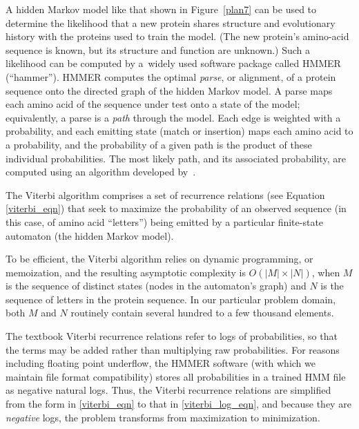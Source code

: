 \documentclass[preprint,nonatbib,blockstyle,nocopyrightspace,times]{sigplanconf}
\newcommand\figref[1]{Figure~\ref{#1}}
\begin{document}
A hidden Markov model like that shown in \figref{plan7} can be used to
determine the likelihood that a new protein shares structure and
evolutionary history with the proteins used to train the model.
(The new protein's amino-acid sequence is known, but its structure and
function are unknown.)
Such a likelihood can be computed by
a~widely used software package called HMMER (``hammer'').
HMMER computes the optimal \textit{parse}, or 
alignment, of a protein sequence onto the directed graph of the hidden Markov 
model.
A parse maps each amino acid of the sequence under test onto a state
of the model; equivalently, a parse is a \textit{path} through the model.
Each edge is weighted with a probability, and each emitting 
state (match or insertion) maps each amino acid to a probability,
and the 
probability of a given path is the product of these individual probabilities.
The most likely path, and its associated probability, are computed 
using an algorithm developed by~\citet{Viterbi:1967hq}.


The Viterbi algorithm comprises a set of recurrence 
relations (see Equation \ref{viterbi_eqn}) that seek to maximize the 
probability of an observed sequence (in this case, of amino acid ``letters'') 
being emitted by a particular finite-state automaton (the hidden Markov model).

To be efficient, the Viterbi 
algorithm relies on dynamic programming, or memoization, and the resulting 
asymptotic complexity is $O(|M|\times|N|)$, when $M$ is the sequence of 
distinct states (nodes in the automaton's graph) and $N$ is the sequence of 
letters in the protein sequence.
In our particular problem domain, both $M$ and 
$N$ routinely contain several hundred to a few thousand elements.

% 
% 
% 

The textbook Viterbi recurrence relations refer to logs of probabilities, so 
that the terms may be added rather than multiplying raw probabilities.
For 
reasons including floating point underflow, the HMMER software (with which we 
maintain file format compatibility) stores all probabilities in a trained HMM 
file as negative natural logs.
Thus, the Viterbi recurrence relations are 
simplified from the form in \ref{viterbi_eqn} to that in \ref{viterbi_log_eqn}, 
and because they are \textit{negative} logs, the problem transforms from 
maximization to minimization.
\end{document}
